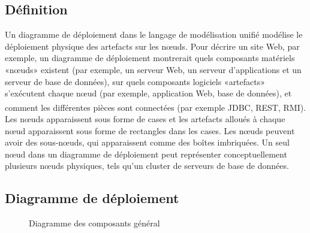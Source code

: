 \documentclass[12pt]{report}
\begin{document}
\subsection{Définition}
\hspace*{0.16in}
Un diagramme de déploiement dans le langage de modélisation unifié modélise le déploiement physique des artefacts sur les nœuds. Pour décrire un site Web, par exemple, un diagramme de déploiement montrerait quels composants matériels «nœuds» existent (par exemple, un serveur Web, un serveur d’applications et un serveur de base de données), sur quels composants logiciels «artefacts» s’exécutent chaque nœud (par exemple, application Web, base de données), et comment les différentes pièces sont connectées (par exemple JDBC, REST, RMI). \textsuperscript{\cite{booch2005unified}}
\\
\hspace*{0.16in}
Les nœuds apparaissent sous forme de cases et les artefacts alloués à chaque nœud apparaissent sous forme de rectangles dans les cases. Les nœuds peuvent avoir des sous-nœuds, qui apparaissent comme des boîtes imbriquées. Un seul nœud dans un diagramme de déploiement peut représenter conceptuellement plusieurs nœuds physiques, tels qu’un cluster de serveurs de base de données.

\subsection{Diagramme de déploiement}

\begin{figure}[h]
\centering
    \centerline{}
    \caption{Diagramme des composants général}
\end{figure}
\end{document}
